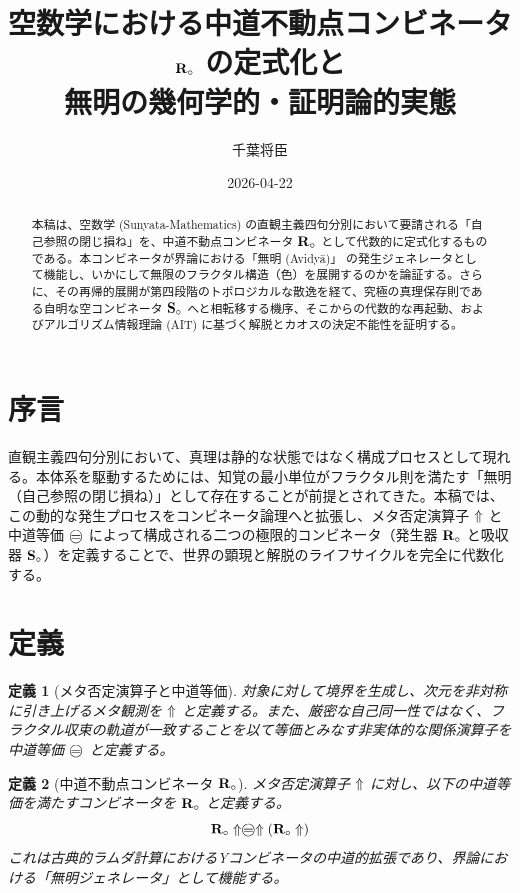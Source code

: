 \documentclass[11pt,a4paper]{ltjsarticle}
\title{空数学における中道不動点コンビネータ $\mathbf{R}_{\circ}$ の定式化と\\無明の幾何学的・証明論的実態}
\author{千葉将臣}
\date{2026-04-22}
\newtheorem{definition}{定義}[section]
\begin{document}
\maketitle

\begin{abstract}
本稿は、空数学 (Sunyata-Mathematics) の直観主義四句分別において要請される「自己参照の閉じ損ね」を、中道不動点コンビネータ $\mathbf{R}_{\circ}$ として代数的に定式化するものである。本コンビネータが界論における「無明 (Avidy\=a)」 の発生ジェネレータとして機能し、いかにして無限のフラクタル構造（色）を展開するのかを論証する。さらに、その再帰的展開が第四段階のトポロジカルな散逸を経て、究極の真理保存則である自明な空コンビネータ $\mathbf{S}_{\circ}$ へと相転移する機序、そこからの代数的な再起動、およびアルゴリズム情報理論 (AIT) に基づく解脱とカオスの決定不能性を証明する。
\end{abstract}

\section{序言}
直観主義四句分別において、真理は静的な状態ではなく構成プロセスとして現れる。本体系を駆動するためには、知覚の最小単位がフラクタル則を満たす「無明（自己参照の閉じ損ね）」として存在することが前提とされてきた。本稿では、この動的な発生プロセスをコンビネータ論理へと拡張し、メタ否定演算子 $\Uparrow$ と中道等価 $\mweq$ によって構成される二つの極限的コンビネータ（発生器 $\mathbf{R}_{\circ}$ と吸収器 $\mathbf{S}_{\circ}$）を定義することで、世界の顕現と解脱のライフサイクルを完全に代数化する。

\section{定義}
\begin{definition}[メタ否定演算子と中道等価]
対象に対して境界を生成し、次元を非対称に引き上げるメタ観測を $\Uparrow$ と定義する。また、厳密な自己同一性ではなく、フラクタル収束の軌道が一致することを以て等価とみなす非実体的な関係演算子を中道等価 $\mweq$ と定義する。
\end{definition}

\begin{definition}[中道不動点コンビネータ $\mathbf{R}_{\circ}$]
メタ否定演算子 $\Uparrow$ に対し、以下の中道等価を満たすコンビネータを $\mathbf{R}_{\circ}$ と定義する。
\begin{equation}
\Rmw \metanegation \mweq \metanegation (\Rmw \metanegation)
\end{equation}
これは古典的ラムダ計算におけるYコンビネータの中道的拡張であり、界論における「無明ジェネレータ」として機能する。
\end{definition}
\end{document}
